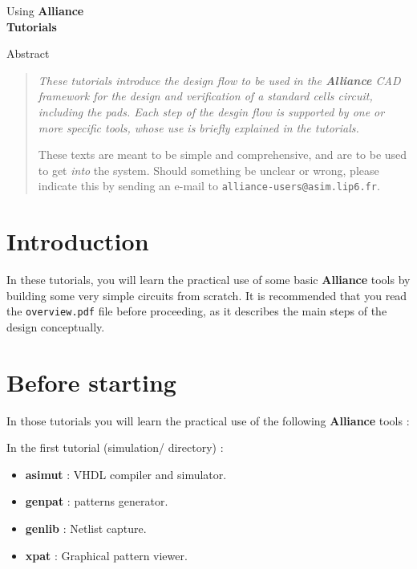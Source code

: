 \documentclass{article}
\begin{document}
\begin{center}
\Huge Using \bf Alliance\\
\Huge Tutorials
\end{center}
\vspace{2cm}

%
\begin{center}
Abstract

\begin{quote}
\em
These tutorials introduce the design flow to be used in the
\textbf{Alliance} CAD framework for the design and verification of a 
standard cells circuit, including the pads.
Each step of the desgin flow is supported by one or more specific 
tools, whose use is briefly explained in the tutorials.

These texts are meant to be simple and comprehensive, and are to be used
to get \emph{into} the system.
Should something be unclear or wrong, please indicate this by sending
an e-mail to \texttt{alliance-users@asim.lip6.fr}.
\rm
\end{quote}
\end{center}


\section{Introduction}
In these tutorials, you will learn the practical use of some basic
\textbf{Alliance} tools by building some very simple circuits from scratch.
It is recommended that you read the \texttt{overview.pdf} file before
proceeding, as it describes the main steps of the design conceptually.

\section{Before starting}
In those tutorials you will learn the practical use of the following 
\textbf{Alliance} tools :

In the first tutorial (simulation/ directory) :
\begin{itemize}
\item \textbf{asimut} : VHDL compiler and simulator.
\item \textbf{genpat} : patterns generator.
\item \textbf{genlib} : Netlist capture.
\item \textbf{xpat}   : Graphical pattern viewer.
\end{itemize}
\end{document}
